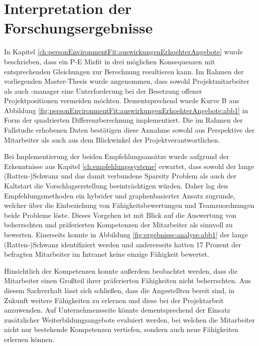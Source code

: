 \section{Interpretation der Forschungsergebnisse}
\label{ch:diskussion:interpretation}
In Kapitel \ref{ch:personEnvironmentFit:auswirkungenErhoehterAngebote} wurde beschrieben, dass ein P-E Misfit in drei möglichen Konsequenzen mit entsprechenden Gleichungen zur Berechnung resultieren kann. Im Rahmen der vorliegenden Master-Thesis wurde angenommen, dass sowohl Projektmitarbeiter als auch -manager eine Unterforderung bei der Besetzung offener Projektpositionen vermeiden möchten. Dementsprechend wurde Kurve B aus Abbildung \ref{fig:personEnvironmentFit:auswirkungenErhoehterAngebote:abb1} in Form der quadrierten Differenzberechnung implementiert. Die im Rahmen der Fallstudie erhobenen Daten bestätigen diese Annahme sowohl aus Perspektive der Mitarbeiter als auch aus dem Blickwinkel der Projektverantwortlichen. 

Bei Implementierung der beiden Empfehlungsansätze wurde aufgrund der Erkenntnisse aus Kapitel \ref{ch:empfehlungssysteme} erwartet, dass sowohl der lange (Ratten-)Schwanz und das damit verbundene Sparsity Problem als auch der Kaltstart die Vorschlagserstellung beeinträchtigen würden. Daher lag den Empfehlungsmethoden ein hybrider und graphenbasierter Ansatz zugrunde, welcher über die Einbeziehung von Fähigkeitsbewertungen und Teamzuordnungen beide Probleme löste. Dieses Vorgehen ist mit Blick auf die Auswertung von beherrschten und präferierten Kompetenzen der Mitarbeiter als sinnvoll zu bewerten. Einerseits konnte in Abbildung \ref{fig:ergebnisse:analyse:abb1} der lange (Ratten-)Schwanz identifiziert werden und andererseits hatten 17 Prozent der befragten Mitarbeiter im Intranet keine einzige Fähigkeit bewertet.%

Hinsichtlich der Kompetenzen konnte außerdem beobachtet werden, dass die Mitarbeiter einen Großteil ihrer präferierten Fähigkeiten nicht beherrschten. Aus diesem Sachverhalt lässt sich schließen, dass die Angestellten bereit sind, in Zukunft weitere Fähigkeiten zu erlernen und diese bei der Projektarbeit anzuwenden. Auf Unternehmensseite könnte dementsprechend der Einsatz zusätzlicher Weiterbildungsangebote evaluiert werden, bei welchen die Mitarbeiter nicht nur bestehende Kompetenzen vertiefen, sondern auch neue Fähigkeiten erlernen können.

